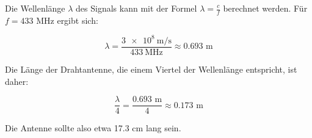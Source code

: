 \begin{lösung}
Die Wellenlänge \(\lambda\) des Signals kann mit der Formel \(\lambda = \frac{c}{f}\) berechnet werden. Für \(f = 433\) MHz ergibt sich:

\[
\lambda = \frac{\SI{3e8}{\meter\per\second}}{\SI{433}{\mega\hertz}} \approx 0.693 \text{ m}
\]

Die Länge der Drahtantenne, die einem Viertel der Wellenlänge entspricht, ist daher:

\[
\frac{\lambda}{4} = \frac{0.693 \text{ m}}{4} \approx 0.173 \text{ m}
\]

Die Antenne sollte also etwa 17.3 cm lang sein.
\end{lösung}
